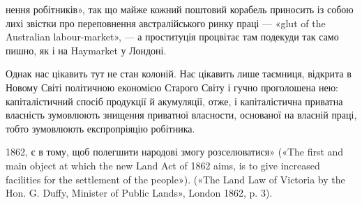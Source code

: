 нення робітників», так що майже кожний поштовий корабель приносить із собою лихі звістки про
переповнення австралійського ринку праці — «glut of the Australian labour-market», — а проституція
процвітає там подекуди так само пишно, як і на Haymarket у Лондоні.

Однак нас цікавить тут не стан колоній. Нас цікавить лише таємниця, відкрита в Новому Світі
політичною економією Старого Світу і гучно проголошена нею: капіталістичний спосіб продукції й
акумуляції, отже, і капіталістична приватна власність зумовлюють знищення приватної власности,
основаної на власній праці, тобто зумовлюють експропріяцію робітника.

1862, є в тому, щоб полегшити народові змогу розселюватися» («The first and main object at which the
new Land Act of 1862 aims, is to give increased facilities for the settlement of the people»). («The
Land Law of Victoria by the Hon. G. Duffy, Minister of Public Lands», London 1862, p. 3).
